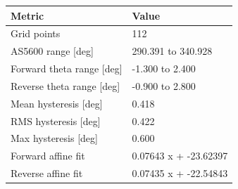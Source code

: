 \small
\begin{tabularx}{0.82\linewidth}{@{}l X@{}}
\toprule
Metric & Value \\
\midrule
Grid points & 112 \\
AS5600 range [deg] & 290.391 to 340.928 \\
Forward theta range [deg] & -1.300 to 2.400 \\
Reverse theta range [deg] & -0.900 to 2.800 \\
Mean hysteresis [deg] & 0.418 \\
RMS hysteresis [deg] & 0.422 \\
Max hysteresis [deg] & 0.600 \\
Forward affine fit & 0.07643 x + -23.62397 \\
Reverse affine fit & 0.07435 x + -22.54843 \\
\bottomrule
\end{tabularx}
